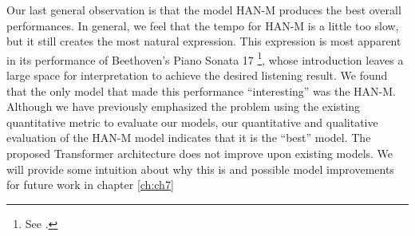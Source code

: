 Our last general observation is that the \vnet{} model HAN-M produces the best overall performances. In general, we feel that the tempo for HAN-M is a little too slow, but it still creates the most natural expression. This expression is most apparent in its performance of Beethoven's Piano Sonata 17%
\footnote{See \href{https://ui.neptune.ai/richt3211/thesis/e/THESIS-162/artifacts}{}.}, whose introduction leaves a large space for interpretation to achieve the desired listening result. We found that the only model that made this performance ``interesting'' was the HAN-M. Although we have previously emphasized the problem using the existing quantitative metric to evaluate our models, our quantitative and qualitative evaluation of the HAN-M model indicates that it is the ``best'' model. The proposed Transformer architecture does not improve upon existing models. We will provide some intuition about why this is and possible model improvements for future work in chapter \ref{ch:ch7}





